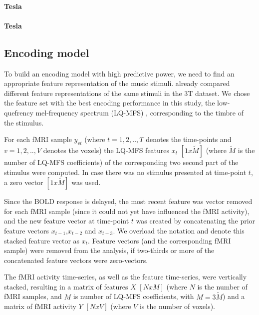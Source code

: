 \paragraph{\unit[3]{Tesla}}
\paragraph{\unit[7]{Tesla}}

\subsection*{Encoding model}

To build an encoding model with high predictive power, we need to find an
appropriate feature representation of the music stimuli.  
\cite{CTK+2012} already compared different feature representations of the same stimuli in the 3T
dataset. We chose the feature set with the best encoding performance in this
study, the low-quefrency mel-frequency spectrum (LQ-MFS) \cite{HDH+2015}, corresponding to the timbre of the stimulus. 




For each f{MRI} sample $y_{vt}$ (where $t=1,2,..,T$ denotes the time-points and
$v=1,2,..,V$ denotes the voxels) the LQ-MFS features $x_{t}$ $[1x\widetilde{M}]$
(where $\widetilde{M}$ is the number of LQ-MFS coefficients) of the
corresponding two second part of the stimulus were computed. In case there was
no stimulus presented at time-point $t$, a zero vector $[1x\widetilde{M}]$ was
used. 

Since the BOLD response is delayed,  the most recent feature was vector removed for each f{MRI} sample (since it could not yet have influenced the f{MRI} activity), 
and the new feature vector at time-point $t$ was created by concatenating the
prior feature vectors $x_{t-1}$,$x_{t-2}$ and $x_{t-3}$. We overload the
notation and denote this stacked feature vector as $x_{t}$. Feature vectors (and the corresponding f{MRI} sample) were removed from the analysis, if two-thirds or more of the concatenated feature vectors were zero-vectors.

The f{MRI} activity time-series, as well as the feature time-series, were
vertically stacked, resulting in a matrix of features $X$ $[NxM]$ (where $N$ is
the number of f{MRI} samples, and $M$ is number of LQ-MFS coefficients, with
$M=3\widetilde{M}$) and a matrix of f{MRI} activity $Y$ $[NxV]$ (where $V$ is the number of voxels).


